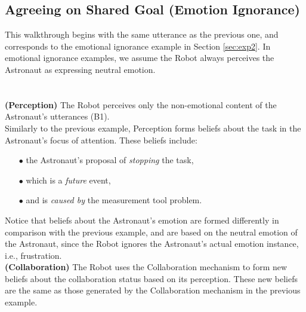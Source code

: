 \subsection{Agreeing on Shared Goal (Emotion Ignorance)}
\label{sec:wt-exp2}

This walkthrough begins with the same utterance as the previous one, and
corresponds to the emotional ignorance example in Section \ref{sec:exp2}. In
emotional ignorance examples, we assume the Robot always perceives the
Astronaut as expressing neutral emotion.\\

\noindent{}\\ \\

\noindent\textbf{(Perception)} The Robot perceives only the non-emotional
content of the Astronaut's utterances (B1).\\

Similarly to the previous example, Perception forms beliefs about the task in
the Astronaut's focus of attention. These beliefs include:

\begin{itemize}
  \item[$\bullet$] the Astronaut's proposal of \textit{stopping} the task,
  \item[$\bullet$] which is a \textit{future} event,
  \item[$\bullet$] and is \textit{caused by} the measurement tool problem.
\end{itemize}

\noindent Notice that beliefs about the Astronaut's emotion are formed
differently in comparison with the previous example, and are based on the
neutral emotion of the Astronaut, since the Robot ignores the Astronaut's actual
emotion instance, i.e., frustration.\\

\noindent\textbf{(Collaboration)} The Robot uses the Collaboration mechanism to
form new beliefs about the collaboration status based on its perception. These
new beliefs are the same as those generated by the Collaboration mechanism in
the previous example.\\

